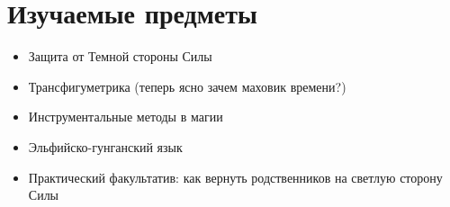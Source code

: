 \documentclass[14pt,a4paper]{extreport}
\begin{document}
\newpage

\section{Изучаемые предметы}
\begin{itemize}
\item Защита от Темной стороны Силы
\item Трансфигуметрика (теперь ясно зачем маховик времени?)
\item Инструментальные методы в магии
\item Эльфийско-гунганский язык
\item Практический факультатив: как вернуть родственников на светлую сторону Силы 
\end{itemize}
\end{document}
